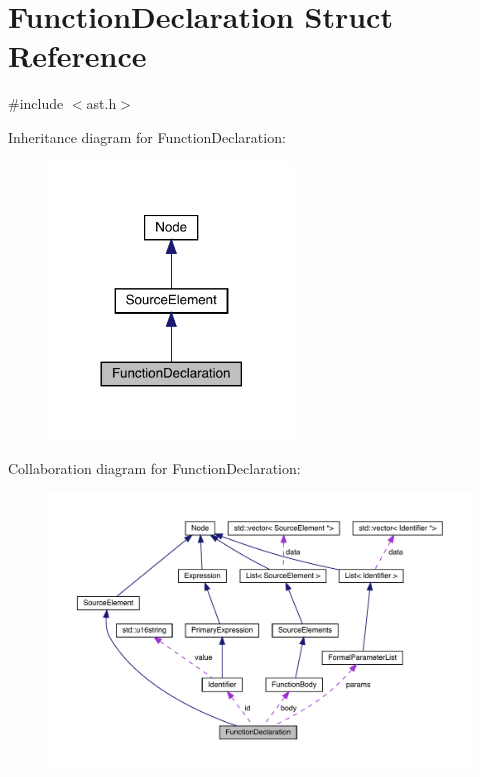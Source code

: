 \hypertarget{struct_function_declaration}{}\section{Function\+Declaration Struct Reference}
\label{struct_function_declaration}


{\ttfamily \#include $<$ast.\+h$>$}



Inheritance diagram for Function\+Declaration\+:
\nopagebreak
\begin{figure}[H]
\begin{center}
\leavevmode
\includegraphics[width=185pt]{struct_function_declaration__inherit__graph}
\end{center}
\end{figure}


Collaboration diagram for Function\+Declaration\+:
\nopagebreak
\begin{figure}[H]
\begin{center}
\leavevmode
\includegraphics[width=350pt]{struct_function_declaration__coll__graph}
\end{center}
\end{figure}
